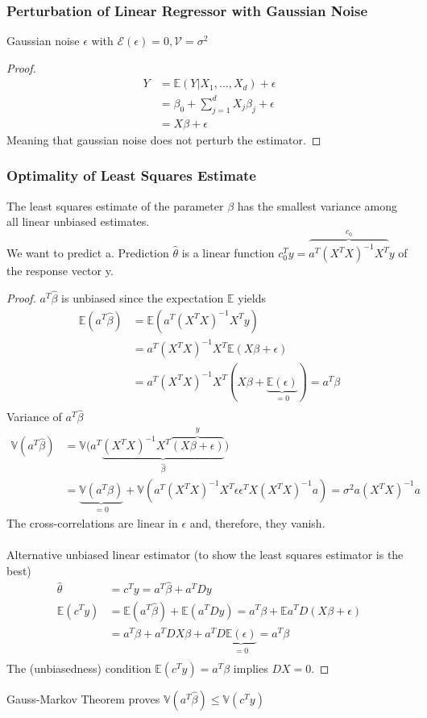 \documentclass[MachineLearning]{subfiles}
\begin{document}
\subsubsection{Perturbation of Linear Regressor with Gaussian Noise}
Gaussian noise \(\epsilon\) with \(\mathcal{E}(\epsilon) = 0, \mathcal{V} = \sigma^2\)
\begin{proof}
\begin{align}
Y &= \mathbb{E}(Y|X_1 , \ldots , X_d) + \epsilon\\
&= \beta_0 + \sum^d_{j=1} X_j \beta_j + \epsilon\\
&= X\beta + \epsilon
\end{align}
Meaning that gaussian noise does not perturb the estimator.
\end{proof}

\subsubsection{Optimality of Least Squares Estimate}
The least squares estimate of the parameter \(\beta\) has the smallest variance among all linear unbiased estimates.\\
We want to predict a. Prediction \(\hat{\theta}\) is a linear function \(c_0^Ty = \overbrace{a^T (X^T X)^{-1} X^T}^{c_0} y\) of the response vector y.
\begin{proof}

\(a^T \hat{\beta}\) is unbiased since the expectation \(\mathbb{E}\) yields
\begin{align}
\mathbb{E}(a^T \hat{\beta}) &= \mathbb{E}(a^T (X^T X)^{-1} X^T y)\\
&= a^T (X^T X)^{-1} X^T \mathbb{E}(X\beta + \epsilon)\\
&= a^T (X^T X)^{-1} X^T (X\beta + \underbrace{\mathbb{E}(\epsilon)}_{=0} ) = a^T \beta\\
\end{align}
Variance of \(a^T\hat{\beta}\)
\begin{align}
\mathbb{V}(a^T \hat{\beta}) &= \mathbb{V}\Big( a^T \underbrace{(X^T X)^{-1} X^T \overbrace{(X\beta + \epsilon)}^{y}}_{\hat{\beta}}\Big)\\
&= \underbrace{\mathbb{V}(a^T \beta)}_{=0} +\mathbb{V}\left(a^T (X^T X)^{-1} X^T \epsilon\epsilon^T X(X^T X)^{-1} a\right)
= \sigma^2 a (X^T X)^{-1} a
\end{align}
The cross-correlations are linear in \(\epsilon\) and, therefore, they vanish.\\\\
Alternative unbiased linear estimator (to show the least squares estimator is the best)
\begin{align}
\hat{\theta} &= c^T y = a^T \hat{\beta} + a^T Dy\\
\mathbb{E}(c^T y) &= \mathbb{E}(a^T \hat{\beta}) + \mathbb{E}(a^T Dy) = a^T \beta + \mathbb{E} a^T D(X\beta + \epsilon)\\
&= a^T \beta + a^T DX\beta + a^T D \underbrace{\mathbb{E}(\epsilon)}_{=0} = a^T \beta\\
\end{align}
The (unbiasedness) condition \(\mathbb{E}(c^T y) = a^T \beta\) implies \(DX = 0\).
\end{proof}
Gauss-Markov Theorem proves \(\mathbb{V}(a^T\hat{\beta}) \leq \mathbb{V}(c^Ty)\)
\end{document}
